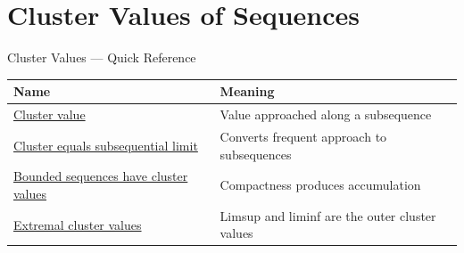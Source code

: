 \section{Cluster Values of Sequences}

\begin{toolkitbox}{Cluster Values --- Quick Reference}
\small
\begin{tabular}{l l}
\toprule
\textbf{Name} & \textbf{Meaning} \\
\midrule
\hyperref[def:cluster-value-sequence]{Cluster value} & Value approached along a subsequence \\
\hyperref[thm:cluster-values-are-subsequential-limits]{Cluster equals subsequential limit} & Converts frequent approach to subsequences \\
\hyperref[thm:bounded-sequences-have-cluster-values]{Bounded sequences have cluster values} & Compactness produces accumulation \\
\hyperref[thm:limsup-liminf-extremal-cluster-values]{Extremal cluster values} & Limsup and liminf are the outer cluster values \\
\bottomrule
\end{tabular}
\end{toolkitbox}


